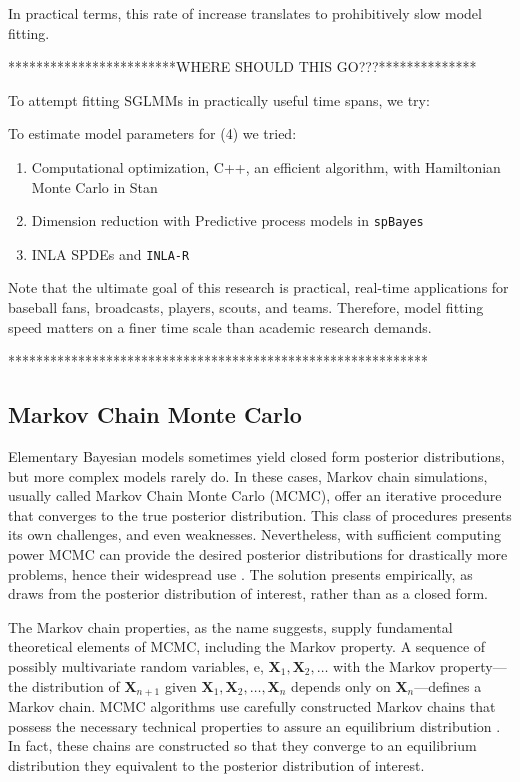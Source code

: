 In practical terms, this rate of increase translates to prohibitively slow model fitting. 


************************WHERE SHOULD THIS GO???**************

To attempt fitting SGLMMs in practically useful time spans, we try: 

To estimate model parameters for (4) we tried:
\begin{enumerate}
\item Computational optimization, C++, an efficient algorithm, with Hamiltonian Monte Carlo in Stan
\item Dimension reduction with Predictive process models in \verb|spBayes|
\item INLA SPDEs and \verb|INLA-R|
\end{enumerate}

Note that the ultimate goal of this research is practical, real-time applications for baseball fans, broadcasts, players, scouts, and teams. Therefore, model fitting speed matters on a finer time scale than academic research demands.  

************************************************************

\subsection{Markov Chain Monte Carlo}

Elementary Bayesian models sometimes yield closed form posterior distributions, but more complex models rarely do. In these cases, Markov chain simulations, usually called Markov Chain Monte Carlo (MCMC), offer an iterative procedure that converges to the true posterior distribution. This class of procedures presents its own challenges, and even weaknesses.  Nevertheless, with sufficient computing power MCMC can provide the desired posterior distributions for drastically more problems, hence their widespread use \cite{Banerjee2014}. The solution presents empirically, as draws from the posterior distribution of interest, rather than as a closed form. 

The Markov chain properties, as the name suggests, supply fundamental theoretical elements of MCMC, including the Markov property. A sequence of possibly multivariate random variables, e, $\pmb{X}_{1}, \pmb{X}_{2}, \hdots$ with the Markov property---the distribution of $\pmb{X}_{n+1}$ given $\pmb{X}_{1}, \pmb{X}_{2}, \hdots , \pmb{X}_{n}$ depends only on $\pmb{X}_{n}$---defines a Markov chain. MCMC algorithms use carefully constructed Markov chains that possess the necessary technical properties to assure an equilibrium distribution \citep{Brooks2011}. In fact, these chains are constructed so that they  converge to an equilibrium distribution they equivalent to the posterior distribution of interest.

